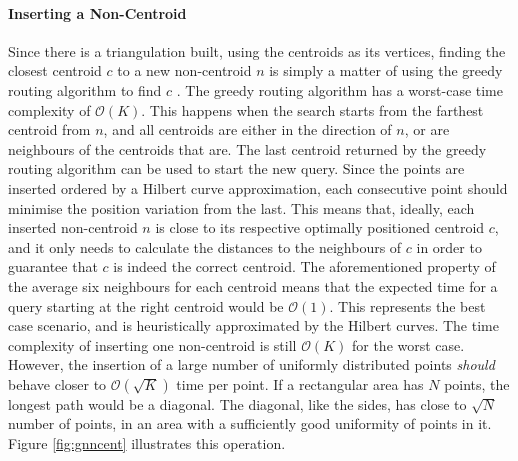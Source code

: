 \paragraph{Inserting a Non-Centroid}
Since there is a triangulation built, using the centroids as its vertices, finding the closest centroid $c$ to a new non-centroid $n$ is simply a matter of using the greedy routing algorithm to find $c$ \cite{greedyroute}.
The greedy routing algorithm has a worst-case time complexity of $\mathcal{O}(K)$. This happens when the search starts from the farthest centroid from $n$, and all centroids are either in the direction of $n$, or are neighbours of the centroids that are. 
The last centroid returned by the greedy routing algorithm can be used to start the new query. Since the points are inserted ordered by a Hilbert curve approximation, each consecutive point should minimise the position variation from the last.
This means that, ideally, each inserted non-centroid $n$ is close to its respective optimally positioned centroid $c$, and it only needs to calculate the distances to the neighbours of $c$ in order to guarantee that $c$ is indeed the correct centroid.
The aforementioned property of the average six neighbours for each centroid means that the expected time for a query starting at the right centroid would be $\mathcal{O}(1)$. This represents the best case scenario, and is heuristically approximated by the Hilbert curves. The time complexity of inserting one non-centroid is still $\mathcal{O}(K)$ for the worst case. 
However, the insertion of a large number of uniformly distributed points \emph{should} behave closer to $\mathcal{O}(\sqrt{K})$ time per point. If a rectangular area has $N$ points, the longest path would be a diagonal. The diagonal, like the sides, has close to $\sqrt{N}$ number of points, in an area with a sufficiently good uniformity of points in it. Figure \ref{fig:gnncent} illustrates this operation.



